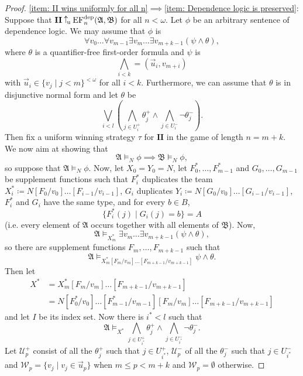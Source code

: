 \documentclass[12pt]{article}
\theoremstyle{definition}
\newcommand{\wins}{\mathbin{\raisebox{0.8\depth}{$\uparrow$}}}
\newcommand{\playertwo}{\mathrm{\mathbf{II}}}
\DeclareMathOperator{\EF}{EF}
\newcommand{\EFdep}{\EF^{\mathrm{dep}}}
\newcommand{\winsu}{\wins_{\!\textrm u}}
\newcommand{\W}{\mathcal W}
\newcommand{\U}{\mathcal U}
\newcommand{\A}{\mathfrak{A}}
\newcommand{\B}{\mathfrak{B}}
\newcommand{\dep}{\mathop{=}}
\begin{document}
\begin{proof}
    \ref{item: II wins uniformly for all n}$\implies$\ref{item: Dependence logic is preserved}: Suppose that $\playertwo\winsu\EFdep_n(\A,\B)$ for all $n<\omega$. Let $\phi$ be an arbitrary sentence of dependence logic. We may assume that $\phi$ is
    \[
         \forall v_0\dots\forall v_{m-1}\exists v_m\dots\exists v_{m+k-1}(\psi\land\theta),
    \]
    where $\theta$ is a  quantifier-free first-order formula and $\psi$ is
    \[
        \bigwedge_{i<k}\dep(\vec u_i, v_{m+i})
    \]
    with $\vec u_i \in\{v_j \mid j<m\}^{<\omega}$ for all $i<k$. Furthermore, we can assume that $\theta$ is in disjunctive normal form and let $\theta$ be
    \[
        \bigvee_{i<l}\left( \bigwedge_{j\in U^+_i}\theta^+_j \land \bigwedge_{j\in U^-_i}\neg\theta^-_j \right).
    \]
    Then fix a uniform winning strategy $\tau$ for $\playertwo$ in the game of length $n = m+k$. We now aim at showing that
    \[
        \A\models_N\phi \implies \B\models_N\phi,
    \]
    so suppose that $\A\models_N\phi$. Now, let $X_0 = Y_0 = N$, let $F^*_0,\dots,F^*_{m-1}$ and $G_0,\dots,G_{m-1}$ be supplement functions such that $F^*_i$ duplicates the team $X^*_i\coloneqq N[F_0/v_0]\dots[F_{i-1}/v_{i-1}]$, $G_i$ duplicates $Y_i\coloneqq N[G_0/v_0]\dots[G_{i-1}/v_{i-1}]$, $F^*_i$ and $G_i$ have the same type, and for every $b\in B$,
    \[
        \{F^*_i(j) \mid G_i(j) = b \} = A
    \]
    (i.e. every element of $\A$ occurs together with all elements of $\B$). Now,
    \[
        \A\models_{X^*_m}\exists v_m\dots\exists v_{m+k-1}(\psi\land\theta),
    \]
    so there are supplement functions $F_m,\dots,F_{m+k-1}$ such that
    \[
        \A\models_{X^*_m[F_m/v_m]\dots[F_{m+k-1}/v_{m+k-1}]}\psi\land\theta.
    \]
    Then let
    \begin{align*}
        X^* &= X^*_m[F_m/v_m]\dots[F_{m+k-1}/v_{m+k-1}] \\
        &= N[F^*_0/v_0]\dots[F^*_{m-1}/v_{m-1}][F_m/v_m]\dots[F_{m+k-1}/v_{m+k-1}]
    \end{align*}
    and let $I$ be its index set.
    Now there is $i^*<l$ such that
    \[
        \A\models_{X^*} \bigwedge_{j\in U^+_{i^*}}\theta^+_j \land \bigwedge_{j\in U^-_{i^*}}\neg\theta^-_j.
    \]
    Let $\U^+_p$ consist of all the $\theta_j^+$ such that $j\in U^+_{i^*}$, $\U^-_p$ of all the $\theta_j^-$ such that $j\in U^-_{i^*}$ and $\W_p = \{v_j \mid v_j\in\vec u_p\}$ when $m\leq p < m+k$ and $\W_p = \emptyset$ otherwise.


\end{proof}
\end{document}
